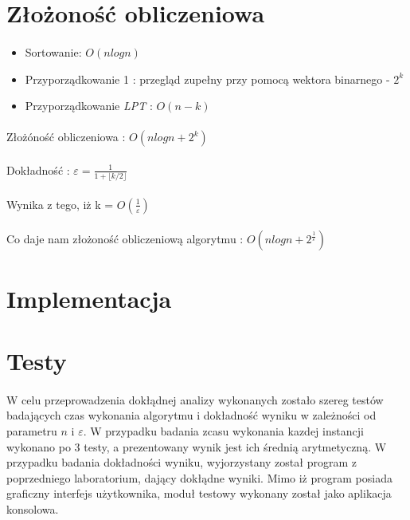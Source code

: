 \documentclass[wide,a4paper,titlepage,12pt] {article}
\begin{document}
\section{Złożoność obliczeniowa}
\paragraph{}
\begin{itemize}
  \item Sortowanie: $O(nlogn)$
  \item Przyporządkowanie 1 : przegląd zupełny przy pomocą wektora binarnego - $2^k$
  \item Przyporządkowanie \textit{LPT} : $O(n-k)$
\end{itemize}

\paragraph{}
Złożóność obliczeniowa : $O(nlogn + 2^k)$
\paragraph{}
Dokładność : 
$\varepsilon = \frac{1}{1+\lfloor k/2 \rfloor}$
\paragraph{}
 Wynika z tego, iż k = $O(\frac{1}{\varepsilon})$
\paragraph{}
Co daje nam złożoność obliczeniową algorytmu : $O(nlogn + 2^{\frac{1}{\varepsilon}})$

\section{Implementacja}
\paragraph{}

\section{Testy}
\paragraph{}
W celu przeprowadzenia dokłądnej analizy wykonanych zostało szereg testów badających czas wykonania algorytmu i dokładność wyniku w zależności od parametru $n$ i $\varepsilon$. W przypadku badania zcasu wykonania kazdej instancji wykonano po 3 testy, a prezentowany wynik jest ich średnią arytmetyczną. W przypadku badania dokładności wyniku, wyjorzystany został program z poprzedniego laboratorium, dający dokłądne wyniki. Mimo iż program posiada graficzny interfejs użytkownika, moduł testowy wykonany został jako aplikacja konsolowa.
\end{document}
